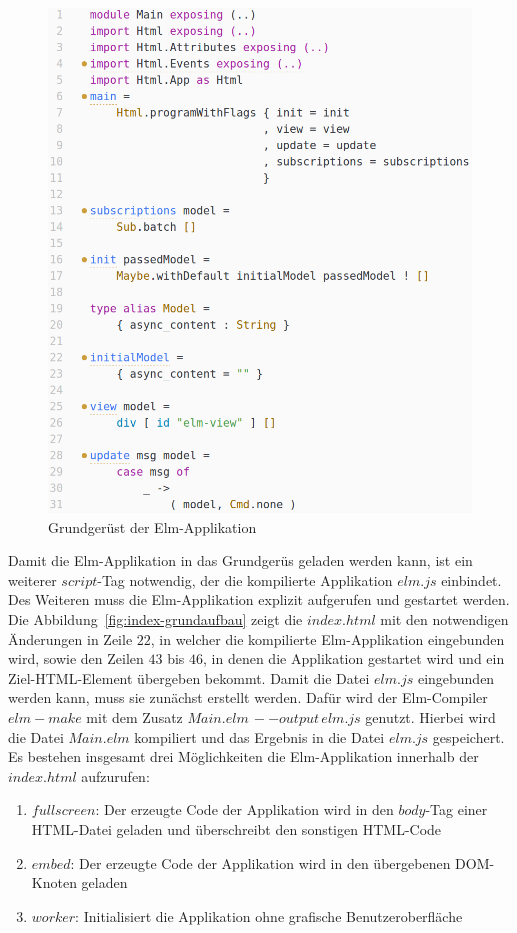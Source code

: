 \begin{figure}[p]
\centering
\includegraphics[scale=0.5]{img/elm-grundaufbau-start.png}
\caption{Grundgerüst der Elm-Applikation}\label{fig:elm-grundaufbau-start}
\end{figure}
Damit die Elm-Applikation in das Grundgerüs geladen werden kann, ist ein weiterer $script$-Tag notwendig, der die kompilierte Applikation $elm.js$ einbindet. Des Weiteren muss die Elm-Applikation explizit aufgerufen und gestartet werden. Die Abbildung~\ref{fig:index-grundaufbau} zeigt die $index.html$ mit den notwendigen Änderungen in Zeile $22$, in welcher die kompilierte Elm-Applikation eingebunden wird, sowie den Zeilen $43$ bis $46$, in denen die Applikation gestartet wird und ein Ziel-\ac{HTML}-Element übergeben bekommt. Damit die Datei $elm.js$ eingebunden werden kann, muss sie zunächst erstellt werden. Dafür wird der Elm-Compiler $elm-make$ mit dem Zusatz $Main.elm\,--output\,elm.js$ genutzt. Hierbei wird die Datei $Main.elm$ kompiliert und das Ergebnis in die Datei $elm.js$ gespeichert.
Es bestehen insgesamt drei Möglichkeiten die Elm-Applikation innerhalb der $index.html$ aufzurufen:
\begin{enumerate}
\item{$fullscreen$}: Der erzeugte Code der Applikation wird in den $body$-Tag einer \ac{HTML}-Datei geladen und überschreibt den sonstigen \ac{HTML}-Code

\item{$embed$}: Der erzeugte Code der Applikation wird in den übergebenen DOM-Knoten geladen

\item{$worker$}: Initialisiert die Applikation ohne grafische Benutzeroberfläche
\end{enumerate}
